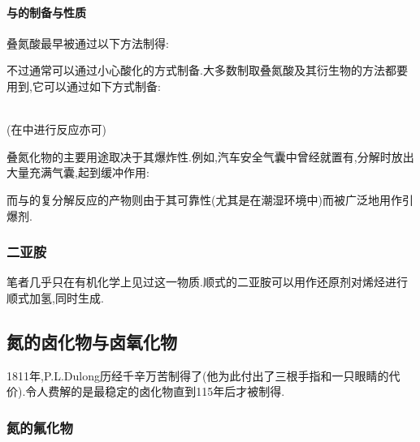 \documentclass{ctexart}
\begin{document}
\paragraph{与的制备与性质}
叠氮酸最早被通过以下方法制得:
\begin{center}
\end{center}
不过通常可以通过小心酸化的方式制备.大多数制取叠氮酸及其衍生物的方法都要用到,它可以通过如下方式制备:
\begin{center}
    \\
    (在中进行反应亦可)\\
\end{center}
叠氮化物的主要用途取决于其爆炸性.例如,汽车安全气囊中曾经就置有,分解时放出大量充满气囊,起到缓冲作用:
\begin{center}
\end{center}
而与的复分解反应的产物则由于其可靠性(尤其是在潮湿环境中)而被广泛地用作引爆剂.
\subsubsection{二亚胺}
笔者几乎只在有机化学上见过这一物质.顺式的二亚胺可以用作还原剂对烯烃进行顺式加氢,同时生成.
\subsection{氮的卤化物与卤氧化物}
1811年,P.L.Dulong历经千辛万苦制得了(他为此付出了三根手指和一只眼睛的代价).令人费解的是最稳定的卤化物直到115年后才被制得.
\subsubsection{氮的氟化物}
\end{document}
